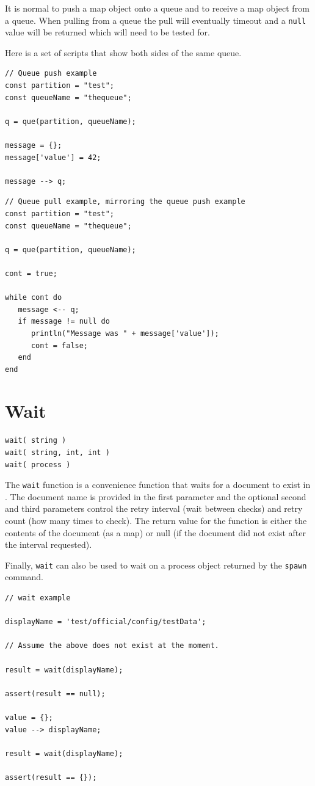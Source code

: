 It is normal to push a map object onto a queue and to receive a map object from a queue. When pulling from a queue the pull will eventually timeout and a \verb+null+ value will be returned which will need to be tested for.

Here is a set of scripts that show both sides of the same queue.

\begin{lstlisting}[caption={Queue push example}]
// Queue push example
const partition = "test";
const queueName = "thequeue";

q = que(partition, queueName);

message = {};
message['value'] = 42;

message --> q;

\end{lstlisting}

\begin{lstlisting}[caption={Queue pull example}]
// Queue pull example, mirroring the queue push example
const partition = "test";
const queueName = "thequeue";

q = que(partition, queueName);

cont = true;

while cont do
   message <-- q;
   if message != null do
      println("Message was " + message['value']);
      cont = false;
   end
end

\end{lstlisting}

\section{Wait}

\begin{verbatim}
wait( string )
wait( string, int, int )
wait( process )
\end{verbatim}

The \verb+wait+ function is a convenience function that waits for a document to exist in \Rapture. The document name is provided in the first parameter and the optional second and third parameters control the retry interval (wait between checks) and retry count (how many times to check). The return value for the function is either the contents of the document (as a map) or null (if the document did not exist after the interval requested). 

Finally, \verb+wait+ can also be used to wait on a process object returned by the \verb+spawn+ command.

\begin{lstlisting}[caption={Wait example}]
// wait example

displayName = 'test/official/config/testData';

// Assume the above does not exist at the moment.

result = wait(displayName);

assert(result == null);

value = {};
value --> displayName;

result = wait(displayName);

assert(result == {});
\end{lstlisting}

